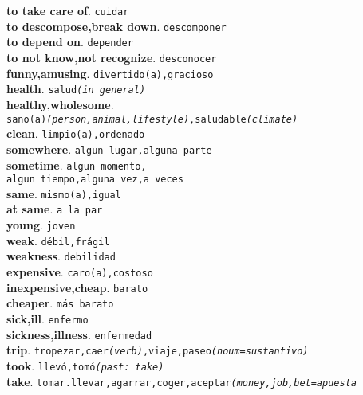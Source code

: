 \documentclass[twocolumn]{article}
\begin{document}
	\textsf{\textbf{to take care of}}. \texttt{cuidar}\\
	\textsf{\textbf{to descompose,break down}}. \texttt{descomponer}\\
	\textsf{\textbf{to depend on}}. \texttt{depender}\\
	\textsf{\textbf{to not know,not recognize}}. \texttt{desconocer}\\
	\textsf{\textbf{funny,amusing}}. \texttt{divertido(a),gracioso}\\
	\textsf{\textbf{health}}. \texttt{salud{\scriptsize \textsl{(in general)}}}\\
	\textsf{\textbf{healthy,wholesome}}.\\
			  \texttt{sano(a){\scriptsize \textsl{(person,animal,lifestyle)}},saludable{\scriptsize \textsl{(climate)}}}\\
   \textsf{\textbf{clean}}. \texttt{limpio(a),ordenado}\\
	\textsf{\textbf{somewhere}}. \texttt{algun lugar,alguna parte}\\
	\textsf{\textbf{sometime}}. \texttt{algun momento,\\algun tiempo,alguna vez,a veces}\\
	\textsf{\textbf{same}}. \texttt{mismo(a),igual}\\
	\textsf{\textbf{at same}}. \texttt{a la par}\\
	\textsf{\textbf{young}}. \texttt{joven}\\
	\textsf{\textbf{weak}}. \texttt{d\'ebil,fr\'agil}\\
	\textsf{\textbf{weakness}}. \texttt{debilidad}\\
	\textsf{\textbf{expensive}}. \texttt{caro(a),costoso}\\
	\textsf{\textbf{inexpensive,cheap}}. \texttt{barato}\\
	\textsf{\textbf{cheaper}}. \texttt{m\'as barato}\\
	\textsf{\textbf{sick,ill}}. \texttt{enfermo}\\
	\textsf{\textbf{sickness,illness}}. \texttt{enfermedad}\\
	\textsf{\textbf{trip}}. \texttt{tropezar,caer{\scriptsize \textsl{(verb)}},viaje,paseo{\scriptsize \textsl{(noum=sustantivo)}}}\\
	\textsf{\textbf{took}}. \texttt{llev\'o,tom\'o{\scriptsize \textsl{(past: take)}}}\\
	\textsf{\textbf{take}}. \texttt{tomar.llevar,agarrar,coger,aceptar{\scriptsize \textsl{(money,job,bet=apuesta}}}\\
\end{document}
